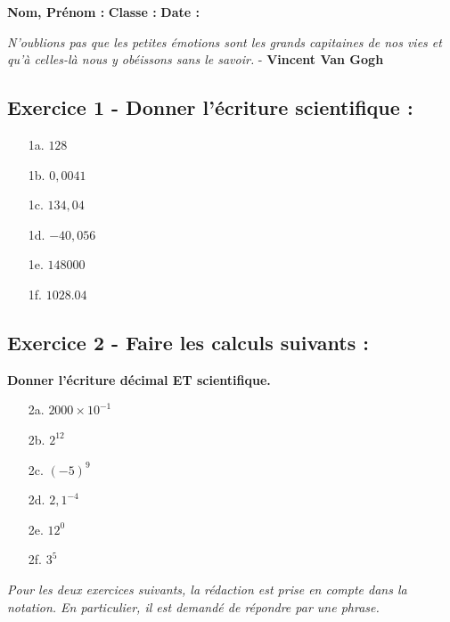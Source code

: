 \documentclass[12pt]{article}
\begin{document}

\textbf{Nom, Prénom :} \hspace{8cm} \textbf{Classe :} \hspace{3cm} \textbf{Date :}

\begin{center}
  \textit{N'oublions pas que les petites émotions sont les grands capitaines de nos vies et qu'à celles-là nous y obéissons sans le savoir.} - \textbf{Vincent Van Gogh}
\end{center}

\subsection*{Exercice 1 - Donner l'écriture scientifique :}

\begin{enumerate}
\item[1a.] $ 128     $ 
\item[1b.] $ 0,0041  $ 
\item[1c.] $ 134,04  $ 
\item[1d.] $ -40,056 $ 
\item[1e.] $ 148 000 $
\item[1f.] $ 1028.04 $
\end{enumerate}

\subsection*{Exercice 2 - Faire les calculs suivants :}
\textbf{Donner l'écriture décimal ET scientifique.}

\begin{enumerate}
\item[2a.] $ 2000 \times 10^{-1} $  
\item[2b.] $ 2^{12}              $  
\item[2c.] $ (-5)^{9}            $  
\item[2d.] $ 2,1^{-4}            $ 
\item[2e.] $ 12^0                $ 
\item[2f.] $ 3^5                 $ 
\end{enumerate}

\textit{Pour les deux exercices suivants, la rédaction est prise en compte dans la notation. En particulier, il est demandé de répondre par une phrase.}
\end{document}
